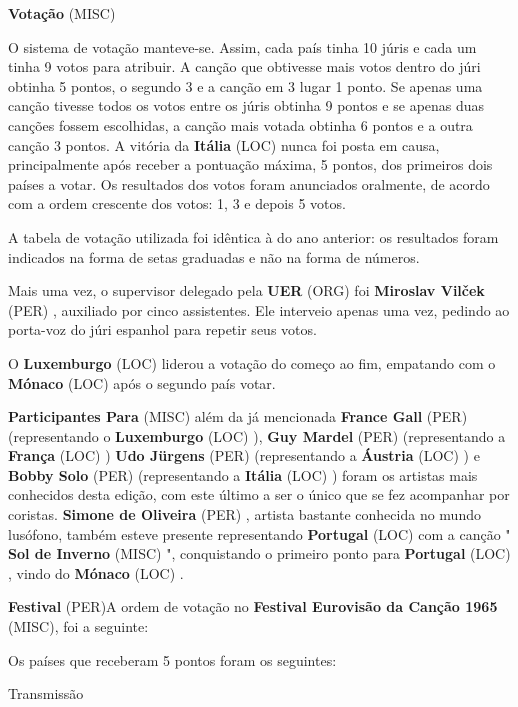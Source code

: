 \documentclass[12pt,a4paper]{article}
\begin{document}
\textbf{Votação} (MISC)

O sistema de votação manteve-se. Assim, cada país tinha 10 júris e cada um tinha 9 votos para atribuir. A canção que obtivesse mais votos dentro do júri obtinha 5 pontos, o segundo 3 e a canção em 3 lugar 1 ponto. Se apenas uma canção tivesse todos os votos entre os júris obtinha 9 pontos e se apenas duas canções fossem escolhidas, a canção mais votada obtinha 6 pontos e a outra canção 3 pontos. A vitória da \textbf{Itália} (LOC) nunca foi posta em causa, principalmente após receber a pontuação máxima, 5 pontos, dos primeiros dois países a votar. Os resultados dos votos foram anunciados oralmente, de acordo com a ordem crescente dos votos: 1, 3 e depois 5 votos.

A tabela de votação utilizada foi idêntica à do ano anterior: os resultados foram indicados na forma de setas graduadas e não na forma de números.

Mais uma vez, o supervisor delegado pela \textbf{UER} (ORG) foi \textbf{Miroslav Vilček} (PER) , auxiliado por cinco assistentes. Ele interveio apenas uma vez, pedindo ao porta-voz do júri espanhol para repetir seus votos.

O \textbf{Luxemburgo} (LOC) liderou a votação do começo ao fim, empatando com o \textbf{Mónaco} (LOC) após o segundo país votar.



\textbf{Participantes Para} (MISC) além da já mencionada \textbf{France Gall} (PER) (representando o \textbf{Luxemburgo} (LOC) ), \textbf{Guy Mardel} (PER) (representando a \textbf{França} (LOC) ) \textbf{Udo Jürgens} (PER) (representando a \textbf{Áustria} (LOC) ) e \textbf{Bobby Solo} (PER) (representando a \textbf{Itália} (LOC) ) foram os artistas mais conhecidos desta edição, com este último a ser o único que se fez acompanhar por coristas. \textbf{Simone de Oliveira} (PER) , artista bastante conhecida no mundo lusófono, também esteve presente representando \textbf{Portugal} (LOC) com a canção " \textbf{Sol de Inverno} (MISC) ", conquistando o primeiro ponto para \textbf{Portugal} (LOC) , vindo do \textbf{Mónaco} (LOC) .



\textbf{Festival} (PER)A ordem de votação no \textbf{Festival Eurovisão da Canção 1965} (MISC), foi a seguinte:

Os países que receberam 5 pontos foram os seguintes:



Transmissão
\end{document}
